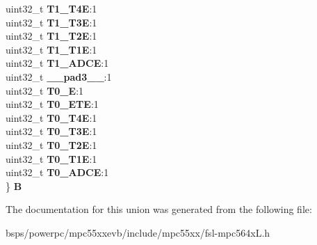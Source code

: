 \begin{DoxyCompactItemize}
\begin{tabbing}
\>uint32\_t {\bfseries T1\_T4E}:1\\
\>uint32\_t {\bfseries T1\_T3E}:1\\
\>uint32\_t {\bfseries T1\_T2E}:1\\
\>uint32\_t {\bfseries T1\_T1E}:1\\
\>uint32\_t {\bfseries T1\_ADCE}:1\\
\>uint32\_t {\bfseries \_\_pad3\_\_}:1\\
\>uint32\_t {\bfseries T0\_E}:1\\
\>uint32\_t {\bfseries T0\_ETE}:1\\
\>uint32\_t {\bfseries T0\_T4E}:1\\
\>uint32\_t {\bfseries T0\_T3E}:1\\
\>uint32\_t {\bfseries T0\_T2E}:1\\
\>uint32\_t {\bfseries T0\_T1E}:1\\
\>uint32\_t {\bfseries T0\_ADCE}:1\\
\} {\bfseries B}\\

\end{tabbing}\end{DoxyCompactItemize}


The documentation for this union was generated from the following file\+:\begin{DoxyCompactItemize}
\item 
bsps/powerpc/mpc55xxevb/include/mpc55xx/fsl-\/mpc564x\+L.\+h\end{DoxyCompactItemize}
